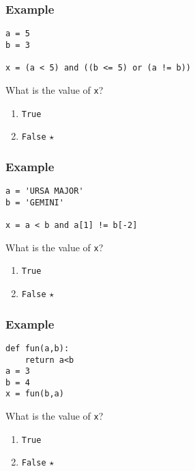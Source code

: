 \documentclass[11pt]{beamer}
\begin{document}
\begin{frame}[fragile]
  \frametitle{Example}
  \Enlarge

  \begin{Verbatim}[commandchars=\\\{\},commentchar=\%]
a = 5
b = 3

x = (a < 5) and ((b <= 5) or (a != b))
  \end{Verbatim}
  What is the value of \texttt{x}?
  \begin{enumerate}[label=\Alph*]
  \item  \texttt{True}
  \item  \texttt{False}  $\star$
  \end{enumerate}
\end{frame}

\begin{frame}[fragile]
  \frametitle{Example}
  \Enlarge

  \begin{Verbatim}[commandchars=\\\{\},commentchar=\%]
a = 'URSA MAJOR'
b = 'GEMINI'

x = a < b and a[1] != b[-2]
  \end{Verbatim}
  What is the value of \texttt{x}?
  \begin{enumerate}[label=\Alph*]
  \item  \texttt{True}
  \item  \texttt{False}  $\star$
  \end{enumerate}
\end{frame}

\begin{frame}[fragile]
  \frametitle{Example}
  \Enlarge

  \begin{Verbatim}[commandchars=\\\{\},commentchar=\%]
def fun(a,b):
    return a<b
a = 3
b = 4
x = fun(b,a)
  \end{Verbatim}
  What is the value of \texttt{x}?
  \begin{enumerate}[label=\Alph*]
  \item  \texttt{True}
  \item  \texttt{False}  $\star$
  \end{enumerate}
\end{frame}
\end{document}
